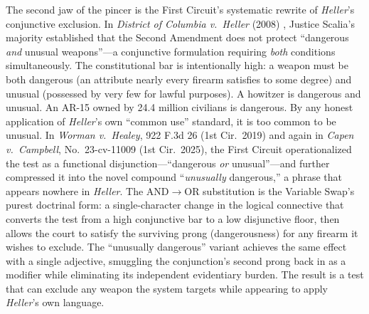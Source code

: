 The second jaw of the pincer is the First Circuit's systematic rewrite of \textit{Heller}'s conjunctive exclusion. In \textit{District of Columbia v.\ Heller} (2008) \cite{heller}, Justice Scalia's majority established that the Second Amendment does not protect ``dangerous \textit{and} unusual weapons''---a conjunctive formulation requiring \textit{both} conditions simultaneously. The constitutional bar is intentionally high: a weapon must be both dangerous (an attribute nearly every firearm satisfies to some degree) and unusual (possessed by very few for lawful purposes). A howitzer is dangerous and unusual. An AR-15 owned by 24.4 million civilians is dangerous. By any honest application of \textit{Heller}'s own ``common use'' standard, it is too common to be unusual. In \textit{Worman v.\ Healey}, 922 F.3d 26 (1st Cir.\ 2019) and again in \textit{Capen v.\ Campbell}, No.\ 23-cv-11009 (1st Cir.\ 2025), the First Circuit operationalized the test as a functional disjunction---``dangerous \textit{or} unusual''---and further compressed it into the novel compound ``\textit{unusually} dangerous,'' a phrase that appears nowhere in \textit{Heller}. The AND$\to$OR substitution is the Variable Swap's purest doctrinal form: a single-character change in the logical connective that converts the test from a high conjunctive bar to a low disjunctive floor, then allows the court to satisfy the surviving prong (dangerousness) for any firearm it wishes to exclude. The ``unusually dangerous'' variant achieves the same effect with a single adjective, smuggling the conjunction's second prong back in as a modifier while eliminating its independent evidentiary burden. The result is a test that can exclude any weapon the system targets while appearing to apply \textit{Heller}'s own language.

